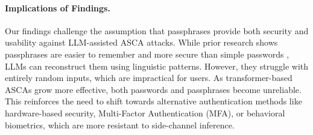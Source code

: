 \paragraph{Implications of Findings.}
Our findings challenge the assumption that passphrases provide both security and usability against LLM-assisted ASCA attacks. While prior research shows passphrases are easier to remember and more secure than simple passwords \cite{keith2009behavioral}, LLMs can reconstruct them using linguistic patterns. However, they struggle with entirely random inputs, which are impractical for users. As transformer-based ASCAs grow more effective, both passwords and passphrases become unreliable. This reinforces the need to shift towards alternative authentication methods like hardware-based security, Multi-Factor Authentication (MFA), or behavioral biometrics, which are more resistant to side-channel inference.


